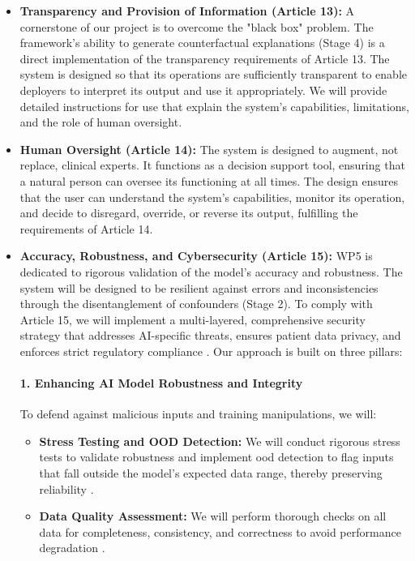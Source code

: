 \documentclass[11pt, a4paper]{article}
\begin{document}
\begin{itemize}
    \item \textbf{Transparency and Provision of Information (Article 13):} A cornerstone of our project is to overcome the "black box" problem. The framework's ability to generate counterfactual explanations (Stage 4) is a direct implementation of the transparency requirements of Article 13. The system is designed so that its operations are sufficiently transparent to enable deployers to interpret its output and use it appropriately. We will provide detailed instructions for use that explain the system's capabilities, limitations, and the role of human oversight.

    \item \textbf{Human Oversight (Article 14):} The system is designed to augment, not replace, clinical experts. It functions as a decision support tool, ensuring that a natural person can oversee its functioning at all times. The design ensures that the user can understand the system's capabilities, monitor its operation, and decide to disregard, override, or reverse its output, fulfilling the requirements of Article 14.

    \item \textbf{Accuracy, Robustness, and Cybersecurity (Article 15):} WP5 is dedicated to rigorous validation of the model's accuracy and robustness. The system will be designed to be resilient against errors and inconsistencies through the disentanglement of confounders (Stage 2). To comply with Article 15, we will implement a multi-layered, comprehensive security strategy that addresses AI-specific threats, ensures patient data privacy, and enforces strict regulatory compliance \cite{AlAttar2023,AlkanZakariyya2025}. Our approach is built on three pillars:

\paragraph{1. Enhancing AI Model Robustness and Integrity}
To defend against malicious inputs and training manipulations, we will:
\begin{itemize}
    \item \textbf{Stress Testing and OOD Detection:} We will conduct rigorous stress tests to validate robustness and implement \gls{ood} detection to flag inputs that fall outside the model's expected data range, thereby preserving reliability \cite{KhadkaEpiphaniou2025}.
    \item \textbf{Data Quality Assessment:} We will perform thorough checks on all data for completeness, consistency, and correctness to avoid performance degradation \cite{GarcaGmezBlanesSelva2023}.
\end{itemize}


\end{itemize}
\end{document}
